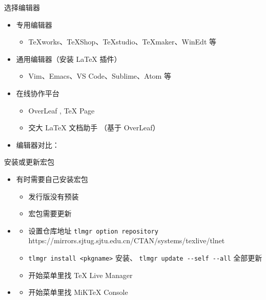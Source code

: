 \begin{frame}{选择编辑器}
  \begin{itemize}
    \item 专用编辑器
          \begin{itemize}
            \item TeXworks、TeXShop、\alert{TeXstudio}、TeXmaker、WinEdt 等
          \end{itemize}
    \item 通用编辑器（安装 \LaTeX{} 插件）
          \begin{itemize}
            \item Vim、Emacs、\alert{VS Code}、Sublime、Atom 等
          \end{itemize}
    \item 在线协作平台
          \begin{itemize}
            \item OverLeaf , \TeX{} Page
            \item 交大 LaTeX 文档助手 （基于 OverLeaf）
          \end{itemize}
    \item 编辑器对比：
  \end{itemize}
\end{frame}

\begin{frame}[fragile]{安装或更新宏包}
  \begin{itemize}
    \item 有时需要自己安装宏包
          \begin{itemize}
            \item 发行版没有预装
            \item 宏包需要更新
          \end{itemize}
    \item \TL
          \begin{itemize}
            \item 设置仓库地址 \verb|tlmgr option repository| {\footnotesize\ttfamily
                      https://mirrors.sjtug.sjtu.edu.cn/CTAN/systems/texlive/tlnet}
            \item \verb|tlmgr install <pkgname>| 安装、 \verb|tlmgr update --self --all| 全部更新
            \item \faWindows{} 开始菜单里找 TeX Live Manager
          \end{itemize}
    \item \MiKTeX
          \begin{itemize}
            \item \faWindows{} 开始菜单里找 MiKTeX Console
          \end{itemize}
  \end{itemize}
\end{frame}

